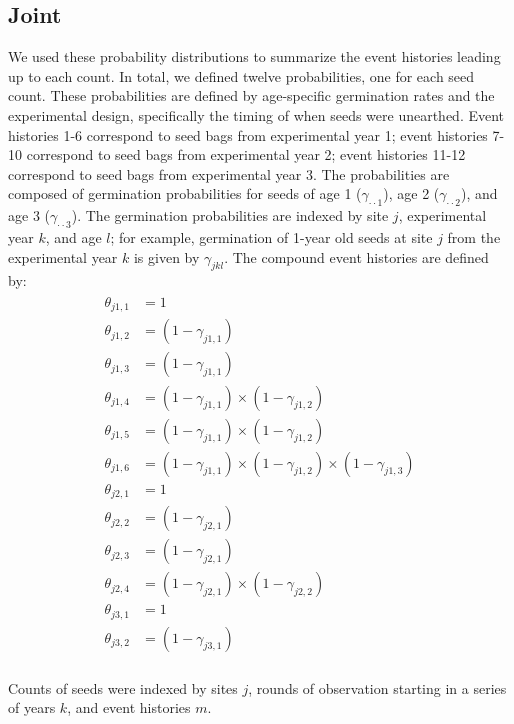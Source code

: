 \documentclass[12pt, oneside, titlepage]{article}   	%
\begin{document}
\subsection{Joint}

We used these probability distributions to summarize the event histories leading up to each count. In total, we defined twelve probabilities, one for each seed count. These probabilities are defined by age-specific germination rates and the experimental design, specifically the timing of when seeds were unearthed. Event histories 1-6 correspond to seed bags from experimental year 1; event histories 7-10 correspond to seed bags from experimental year 2; event histories 11-12 correspond to seed bags from experimental year 3. The probabilities are composed of germination probabilities for seeds of age 1 ($\gamma_{\cdot \cdot 1}$), age 2 ($\gamma_{\cdot \cdot 2}$), and age 3 ($\gamma_{\cdot \cdot 3}$). The germination probabilities are indexed by site $j$, experimental year $k$, and age $l$; for example, germination of 1-year old seeds at site $j$ from the experimental year $k$ is given by $\gamma_{jkl}$. The compound event histories are defined by:
%
\begin{align}
  \begin{split}
\theta_{j1,1} & = 1 \\
\theta_{j1,2} & = (1-\gamma_{j1,1}) \\
\theta_{j1,3} & = (1-\gamma_{j1,1}) \\
\theta_{j1,4} & = (1-\gamma_{j1,1}) \times (1-\gamma_{j1,2}) \\
\theta_{j1,5} & = (1-\gamma_{j1,1}) \times (1-\gamma_{j1,2}) \\
\theta_{j1,6} & = (1-\gamma_{j1,1}) \times (1-\gamma_{j1,2}) \times (1-\gamma_{j1,3}) \\
\theta_{j2,1} & = 1 \\
\theta_{j2,2} & = (1-\gamma_{j2,1}) \\
\theta_{j2,3} & = (1-\gamma_{j2,1}) \\
\theta_{j2,4} & = (1-\gamma_{j2,1}) \times (1-\gamma_{j2,2}) \\
\theta_{j3,1} & = 1 \\
\theta_{j3,2} & = (1-\gamma_{j3,1}) \\
  \end{split}
\end{align}

Counts of seeds were indexed by sites $j$, rounds of observation starting in a series of years $k$, and event histories $m$. 
\end{document}
